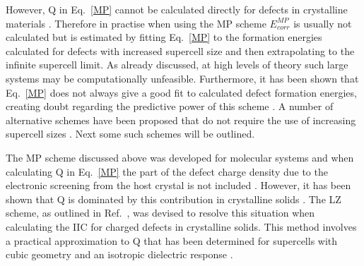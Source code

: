 \documentclass[11pt, twoside]{report}
\begin{document}
However, Q in Eq.~\ref{MP} cannot be calculated directly for defects in crystalline materials \cite{Lany_defects_2008}. Therefore in practise when using the MP scheme $E^{MP}_{corr}$ is usually not calculated but is estimated by fitting Eq.~\ref{MP} to the formation energies calculated for defects with increased supercell size and then extrapolating to the infinite supercell limit. As already discussed, at high levels of theory such large systems may be computationally unfeasible. Furthermore, it has been shown that Eq.~\ref{MP} does not always give a good fit to calculated defect formation energies, creating doubt regarding the predictive power of this scheme \cite{FNV}. A number of alternative schemes have been proposed that do not require the use of increasing supercell sizes \cite{MP, LeslieGillan, PeterSchultz, Lany_defects, FNV, kumagai_oba}. Next some such schemes will be outlined. 


The MP scheme \cite{MP} discussed above was developed for molecular systems and when calculating Q in Eq.~\ref{MP} the part of the defect charge density due to the electronic screening from the host crystal is not included \cite{Lany_defects_2008, Lany_defects}. However, it has been shown that Q is dominated by this contribution in crystalline solids \cite{Lany_defects_2008}. The LZ scheme, as outlined in Ref.~, was devised to resolve this situation when calculating the IIC for charged defects in crystalline solids.
This method involves a practical approximation to Q that has been determined for supercells with cubic geometry and an isotropic dielectric response \cite{Durrant_defects}.
\end{document}
